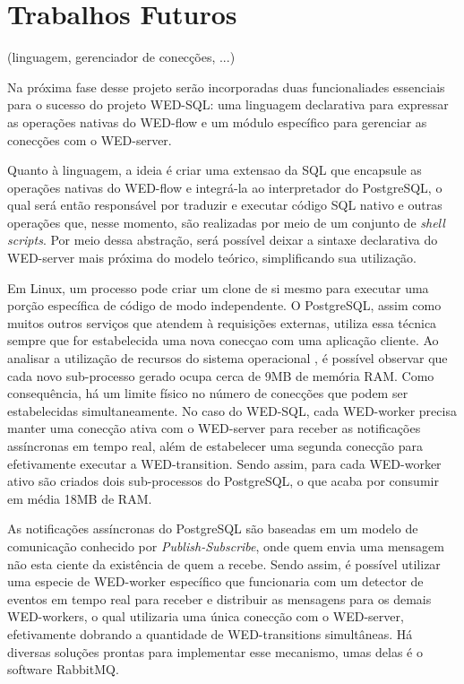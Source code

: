 \documentclass[conference]{IEEEtran}
\begin{document}

\section{Trabalhos Futuros}
(linguagem, gerenciador de conecções, ...)

Na próxima fase desse projeto serão incorporadas duas funcionaliades essenciais para o sucesso do projeto WED-SQL: uma
linguagem declarativa para expressar as operações nativas do WED-flow e um módulo específico para gerenciar as conecções
com o WED-server.
\par Quanto à linguagem, a ideia é criar uma extensao da SQL que encapsule as operações nativas do WED-flow e integrá-la
ao interpretador do PostgreSQL, o qual será então responsável por traduzir e executar código SQL nativo e outras operações que,
nesse momento, são realizadas por meio de um conjunto de \emph{shell scripts}. Por meio dessa abstração, será possível 
deixar a sintaxe declarativa do WED-server mais próxima do modelo teórico, simplificando sua utilização.
\par Em Linux, um processo pode criar um clone de si mesmo para executar uma porção específica de código de modo independente.
O PostgreSQL, assim como muitos outros serviços que atendem à requisições externas, utiliza essa técnica sempre que 
for estabelecida uma nova conecçao com uma aplicação cliente. Ao analisar a utilização de recursos do sistema operacional
, é possível observar que cada novo sub-processo gerado ocupa cerca de 9MB de memória RAM. Como consequência, há um limite
físico no número de conecções que podem ser estabelecidas simultaneamente. No caso do WED-SQL, cada WED-worker precisa 
manter uma conecção ativa com o WED-server para receber as notificações
assíncronas em tempo real, além de estabelecer uma segunda conecção para efetivamente executar a WED-transition. Sendo
assim, para cada WED-worker ativo são criados dois sub-processos do PostgreSQL, o que acaba por consumir em média 18MB
de RAM.
\par As notificações assíncronas do PostgreSQL são baseadas em um modelo de comunicação conhecido por \emph{Publish-Subscribe},
onde quem envia uma mensagem não esta ciente da existência de quem a recebe. Sendo assim, é possível utilizar uma especie
de WED-worker específico que funcionaria com um detector de eventos em tempo real para receber e distribuir as mensagens
para os demais WED-workers, o qual utilizaria uma única conecção com o WED-server, efetivamente dobrando a quantidade
de WED-transitions simultâneas. Há diversas soluções prontas para implementar esse mecanismo, umas delas é o software 
RabbitMQ.
\end{document}
